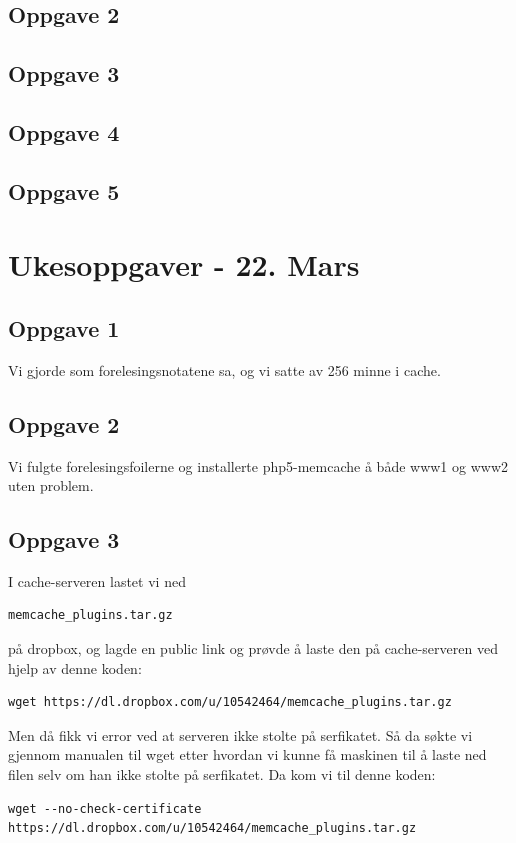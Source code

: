 \documentclass[a4paper, norsk, 12pt]{article}
\begin{document}
\subsection{Oppgave 2}
\subsection{Oppgave 3}
\subsection{Oppgave 4}
\subsection{Oppgave 5}

\section{Ukesoppgaver - 22. Mars}
\subsection{Oppgave 1}
Vi gjorde som forelesingsnotatene sa, og vi satte av 256 minne i cache.

\subsection{Oppgave 2}
Vi fulgte forelesingsfoilerne og installerte php5-memcache å både www1 og www2 uten problem. 

\subsection{Oppgave 3}
I cache-serveren lastet vi ned \begin{verbatim}memcache_plugins.tar.gz \end{verbatim}på dropbox, og lagde en public link og prøvde å laste den på cache-serveren ved hjelp av denne koden:
\begin{verbatim}
wget https://dl.dropbox.com/u/10542464/memcache_plugins.tar.gz
\end{verbatim}
Men då fikk vi error ved at serveren ikke stolte på serfikatet. Så da søkte vi gjennom manualen til wget etter hvordan vi kunne få maskinen til å laste ned filen selv om han ikke stolte på serfikatet. Da kom vi til denne koden:
\begin{verbatim}
wget --no-check-certificate https://dl.dropbox.com/u/10542464/memcache_plugins.tar.gz
\end{verbatim} 
\end{document}
